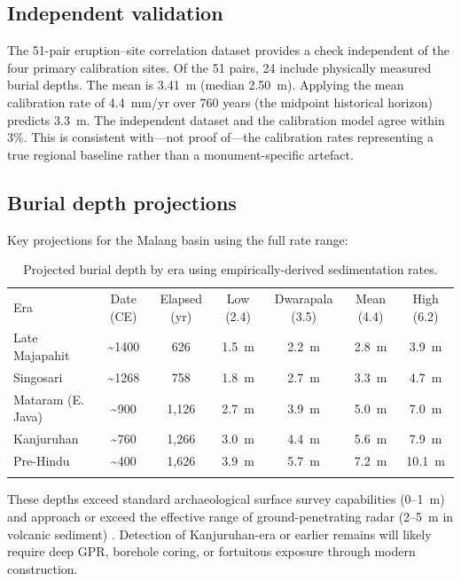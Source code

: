 \documentclass[egqsj, manuscript]{copernicus}
\begin{document}
\subsection{Independent validation}

The 51-pair eruption--site correlation dataset provides a check independent of the four primary calibration sites. Of the 51 pairs, 24 include physically measured burial depths. The mean is 3.41~m (median 2.50~m). Applying the mean calibration rate of 4.4~mm/yr over 760 years (the midpoint historical horizon) predicts 3.3~m. The independent dataset and the calibration model agree within 3\%. This is consistent with---not proof of---the calibration rates representing a true regional baseline rather than a monument-specific artefact.

\subsection{Burial depth projections}

Key projections for the Malang basin using the full rate range:

\begin{table}[t]
\caption{Projected burial depth by era using empirically-derived sedimentation rates.}
\label{tab:depth}
\begin{tabular}{lcccccc}
\tophline
Era & Date (CE) & Elapsed (yr) & Low (2.4) & Dwarapala (3.5) & Mean (4.4) & High (6.2) \\
\middlehline
Late Majapahit & \textasciitilde1400 & 626 & 1.5~m & 2.2~m & 2.8~m & 3.9~m \\
Singosari & \textasciitilde1268 & 758 & 1.8~m & 2.7~m & 3.3~m & 4.7~m \\
Mataram (E. Java) & \textasciitilde900 & 1,126 & 2.7~m & 3.9~m & 5.0~m & 7.0~m \\
Kanjuruhan & \textasciitilde760 & 1,266 & 3.0~m & 4.4~m & 5.6~m & 7.9~m \\
Pre-Hindu & \textasciitilde400 & 1,626 & 3.9~m & 5.7~m & 7.2~m & 10.1~m \\
\bottomhline
\end{tabular}
\belowtable{}
\end{table}

These depths exceed standard archaeological surface survey capabilities (0--1~m) and approach or exceed the effective range of ground-penetrating radar (2--5~m in volcanic sediment) \citep{conyers2004,goodman2013}. Detection of Kanjuruhan-era or earlier remains will likely require deep GPR, borehole coring, or fortuitous exposure through modern construction.
\end{document}
